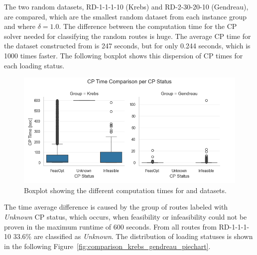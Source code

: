 The two random datasets, RD-1-1-1-10 (Krebs) and RD-2-30-20-10 (Gendreau), are compared, which are the smallest random dataset from each instance group and
where $\delta = 1.0$. The difference between the computation time for the \gls{CP} solver needed for classifying the random routes is huge. The average
\gls{CP} time for the dataset constructed from \krebsADataSetText is 247 seconds, but for \gendreauDataSetText only 0.244 seconds,
which is 1000 times faster. The following boxplot shows this dispersion of \gls{CP} times for each loading status.
\begin{figure}[ht]
	\centering
	\includegraphics[width=\textwidth]{pictures/comparison_krebs_gendreau/boxplot_cp_time.png}
	\caption{Boxplot showing the different computation times for \krebsADataSetText and \gendreauDataSetText datasets.}
	\label{fig:comparison_krebs_gendreau_boxplot}
\end{figure}

The time average difference is caused by the group of routes labeled with \textit{Unknown} \gls{CP} status, which occurs, when
feasibility or infeasibility could not be proven in the maximum runtime of 600 seconds. From all routes from RD-1-1-1-10
33.6\% are classified as \textit{Unknown}. The distribution of loading statuses is shown in the following Figure~\ref{fig:comparison_krebs_gendreau_piechart}.

